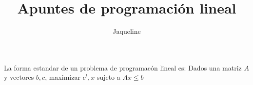 \documentclass{article}
\title{Apuntes de programación lineal}
\author{Jaqueline}
\begin{document}
\maketitle

La forma estandar de un problema de programacón lineal es:
Dados una matriz $A$ y vectores $b,c$, maximizar $c^t,x$ sujeto a
$Ax\leq b$ 
\end{document}
